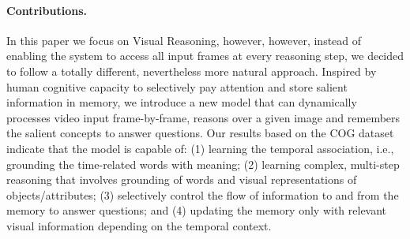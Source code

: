 \paragraph{Contributions.}
In this paper we focus on Visual Reasoning, however, however, instead of enabling the system to access all input frames at every reasoning step, we decided to follow a totally different, nevertheless more natural approach.
Inspired by human cognitive capacity to selectively pay attention and store salient information in memory,
we introduce a new model that can dynamically processes video input frame-by-frame, reasons over a given image and remembers the salient concepts to answer questions.
Our results based on the COG dataset \cite{yang2018dataset} indicate that the model is capable of:
(1) learning the temporal association, i.e., grounding the time-related words with meaning;
(2) learning complex, multi-step reasoning that involves grounding of words and visual representations of objects/attributes;
(3) selectively control the flow of information to and from the memory to answer questions; and
(4) updating the memory only with relevant visual information depending on the temporal context.
%
